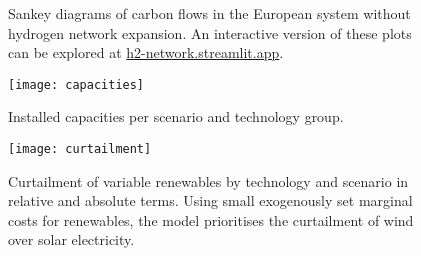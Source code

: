 \begin{figure}
    \caption{Sankey diagrams of carbon flows in the European system without hydrogen network expansion. An interactive version of these plots can be explored at \href{https://h2-network.streamlit.app}{h2-network.streamlit.app}.}
    \label{fig:si:carbon-sankey-2}
\end{figure}

\begin{figure}
    \centering
    \texttt{[image: capacities]}
    \caption{Installed capacities per scenario and technology group.}
    \label{fig:si:capacities}
\end{figure}

\begin{figure}
    \centering
    \texttt{[image: curtailment]}
    \caption{Curtailment of variable renewables by technology and scenario in
    relative and absolute terms. Using small exogenously set marginal costs for
    renewables, the model prioritises the curtailment of wind over solar
    electricity.}
    \label{fig:si:curtailment}
\end{figure}